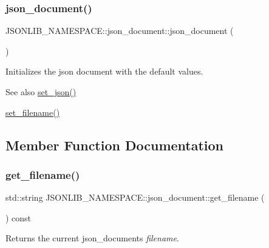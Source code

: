 \subsubsection{\texorpdfstring{json\+\_\+document()}{json\_document()}\hspace{0.1cm}{\footnotesize\ttfamily [3/3]}}
{\footnotesize\ttfamily J\+S\+O\+N\+L\+I\+B\+\_\+\+N\+A\+M\+E\+S\+P\+A\+C\+E\+::json\+\_\+document\+::json\+\_\+document (\begin{DoxyParamCaption}{ }\end{DoxyParamCaption})}



Initializes the json document with the default values. 

\begin{DoxySeeAlso}{See also}
\hyperlink{classJSONLIB__NAMESPACE_1_1json__document_a5a72e4dc0b37b95c70baefad930b5b71}{set\+\_\+json()} 

\hyperlink{classJSONLIB__NAMESPACE_1_1json__document_acc406344661e361c75ac7bc307057712}{set\+\_\+filename()} 
\end{DoxySeeAlso}


\subsection{Member Function Documentation}
\mbox{\label{classJSONLIB__NAMESPACE_1_1json__document_a6f362476926f33fb8c3437d15052e959}} 
\subsubsection{\texorpdfstring{get\+\_\+filename()}{get\_filename()}}
{\footnotesize\ttfamily std\+::string J\+S\+O\+N\+L\+I\+B\+\_\+\+N\+A\+M\+E\+S\+P\+A\+C\+E\+::json\+\_\+document\+::get\+\_\+filename (\begin{DoxyParamCaption}{ }\end{DoxyParamCaption}) const}



Returns the current json\+\_\+documents {\itshape filename}. 

